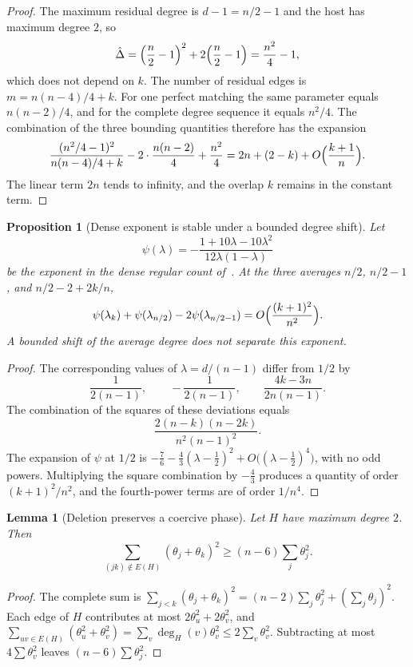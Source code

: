 \documentclass[11pt]{article}
\newtheorem{lemma}[theorem]{Lemma}
\newtheorem{proposition}[theorem]{Proposition}
\begin{document}
\begin{proof}
The maximum residual degree is \(d-1=n/2-1\) and the host has maximum degree \(2\), so
\[
\hat\Delta=\Bigl(\frac n2-1\Bigr)^2+2\Bigl(\frac n2-1\Bigr)=\frac{n^2}{4}-1,
\]
which does not depend on \(k\). The number of residual edges is \(m=n(n-4)/4+k\).
For one perfect matching the same parameter equals \(n(n-2)/4\), and for the complete degree sequence it equals \(n^2/4\).
The combination of the three bounding quantities therefore has the expansion
\[
\frac{(n^2/4-1)^2}{n(n-4)/4+k}-2\cdot\frac{n(n-2)}{4}+\frac{n^2}{4}
=
2n+(2-k)+O\Bigl(\frac{k+1}{n}\Bigr).
\]
The linear term \(2n\) tends to infinity, and the overlap \(k\) remains in the constant term.
\end{proof}

\begin{proposition}[Dense exponent is stable under a bounded degree shift]
\label{prop:dense-exponent}
Let
\[
\psi(\lambda)=-\frac{1+10\lambda-10\lambda^2}{12\lambda(1-\lambda)}
\]
be the exponent in the dense regular count of~\cite[Theorem~1]{MW90}.
At the three averages \(n/2\), \(n/2-1\), and \(n/2-2+2k/n\),
\[
\psi(\lambda_k)+\psi(\lambda_{n/2})-2\psi(\lambda_{n/2-1})=O\Bigl(\frac{(k+1)^2}{n^2}\Bigr).
\]
A bounded shift of the average degree does not separate this exponent.
\end{proposition}

\begin{proof}
The corresponding values of \(\lambda=d/(n-1)\) differ from \(1/2\) by
\[
\frac{1}{2(n-1)},\qquad -\frac{1}{2(n-1)},\qquad \frac{4k-3n}{2n(n-1)}.
\]
The combination of the squares of these deviations equals
\[
\frac{2(n-k)(n-2k)}{n^2(n-1)^2}.
\]
The expansion of \(\psi\) at \(1/2\) is \(-\frac76-\frac43(\lambda-\frac12)^2+O\bigl((\lambda-\frac12)^4\bigr)\), with no odd powers.
Multiplying the square combination by \(-\frac43\) produces a quantity of order \((k+1)^2/n^2\), and the fourth-power terms are of order \(1/n^4\).
\end{proof}

\begin{lemma}[Deletion preserves a coercive phase]
\label{lem:coercive}
Let \(H\) have maximum degree \(2\). Then
\[
\sum_{(jk)\notin E(H)}(\theta_j+\theta_k)^2
\ge
(n-6)\sum_j\theta_j^2.
\]
\end{lemma}

\begin{proof}
The complete sum is \(\sum_{j<k}(\theta_j+\theta_k)^2=(n-2)\sum_j\theta_j^2+(\sum_j\theta_j)^2\).
Each edge of \(H\) contributes at most \(2\theta_u^2+2\theta_v^2\), and \(\sum_{uv\in E(H)}(\theta_u^2+\theta_v^2)=\sum_v\deg_H(v)\theta_v^2\le 2\sum_v\theta_v^2\).
Subtracting at most \(4\sum\theta_v^2\) leaves \((n-6)\sum\theta_j^2\).
\end{proof}
\end{document}
